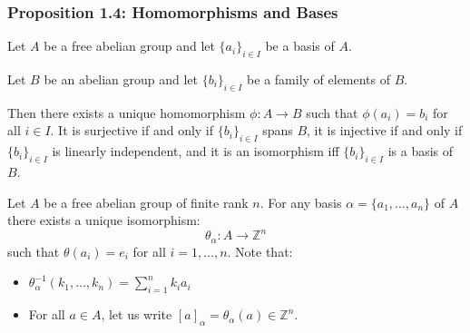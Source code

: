 \documentclass{article}
\begin{document}
\subsubsection{Proposition 1.4: Homomorphisms and Bases}
\begin{idea}
    Let $A$ be a free abelian group and let $\{a_i\}_{i\in I}$ be a basis of $A$.
    \vspace{2mm}

    Let $B$ be an abelian group and let $\{b_i\}_{i\in I}$ be a family of elements of $B$.
    \vspace{2mm}

    Then there exists a unique homomorphism $\phi:A\rightarrow B$ such that $\phi(a_i)=b_i$ for all $i\in I$. It is surjective if and only if $\{b_i\}_{i\in I}$ spans $B$, it is injective if and only if $\{b_i\}_{i\in I}$ is linearly independent, and it is an isomorphism iff $\{b_i\}_{i\in I}$ is a basis of $B$.
\end{idea}
Let $A$ be a free abelian group of finite rank $n$. For any basis $\alpha=\{a_1,\dots,a_n\}$ of $A$ there exists a unique isomorphism:
\begin{equation*}
    \theta_\alpha: A \rightarrow \mathbb{Z}^n
\end{equation*}
such that $\theta(a_i)=e_i$ for all $i=1,\dots,n$. Note that:
\begin{itemize}
    \item $\theta_\alpha^{-1}(k_1,\dots,k_n)=\sum_{i=1}^n k_ia_i$
    \item For all $a\in A$, let us write $[a]_\alpha = \theta_\alpha(a) \in \mathbb{Z}^n$.
\end{itemize}
\end{document}

